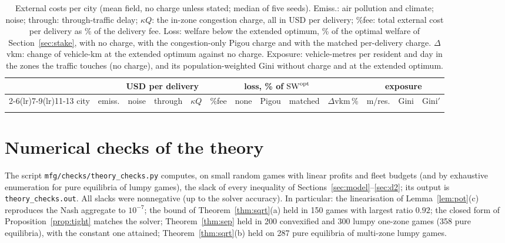 \documentclass[preprint,11pt,authoryear]{elsarticle}
\theoremstyle{plain}
\theoremstyle{remark}
\begin{document}
\begin{table}[!ht]
\centering\footnotesize\setlength{\tabcolsep}{2.6pt}
\caption{External costs per city (mean field, no charge unless stated; median of five seeds). Emiss.: air pollution and climate; noise; through: through-traffic delay; $\kappa Q$: the in-zone congestion charge, all in USD per delivery; \%fee: total external cost per delivery as \% of the delivery fee. Loss: welfare below the extended optimum, \% of the optimal welfare of Section~\ref{sec:stake}, with no charge, with the congestion-only Pigou charge and with the matched per-delivery charge. $\Delta$vkm: change of vehicle-km at the extended optimum against no charge. Exposure: vehicle-metres per resident and day in the zones the traffic touches (no charge), and its population-weighted Gini without charge and at the extended optimum.}\label{tab:extern}
\begin{tabular}{lrrrrrrrrrrrr}
\toprule
& \multicolumn{5}{c}{USD per delivery} & \multicolumn{3}{c}{loss, \% of $\mathrm{SW}^{\mathrm{opt}}$} & & \multicolumn{3}{c}{exposure}\\
\cmidrule(lr){2-6}\cmidrule(lr){7-9}\cmidrule(lr){11-13}
city & emiss. & noise & through & $\kappa Q$ & \%fee & none & Pigou & matched & $\Delta$vkm\,\% & m/res. & Gini & Gini$'$\\
\midrule
\\
\bottomrule
\end{tabular}
\end{table}

\FloatBarrier
\section{Numerical checks of the theory}\label{app:checks}
The script \texttt{mfg/checks/theory\_checks.py} computes, on small random games with linear profits and fleet budgets (and by exhaustive enumeration for pure equilibria of lumpy games), the slack of every inequality of Sections~\ref{sec:model}--\ref{sec:d2}; its output is \texttt{theory\_checks.out}. All slacks were nonnegative (up to the solver accuracy). In particular: the linearisation of Lemma~\ref{lem:pot}(c) reproduces the Nash aggregate to $10^{-7}$; the bound of Theorem~\ref{thm:sqrt}(a) held in 150 games with largest ratio $0.92$; the closed form of Proposition~\ref{prop:tight} matches the solver; Theorem~\ref{thm:sep} held in 200 convexified and 300 lumpy one-zone games (358 pure equilibria), with the constant one attained; Theorem~\ref{thm:sqrt}(b) held on 287 pure equilibria of multi-zone lumpy games.
\end{document}
